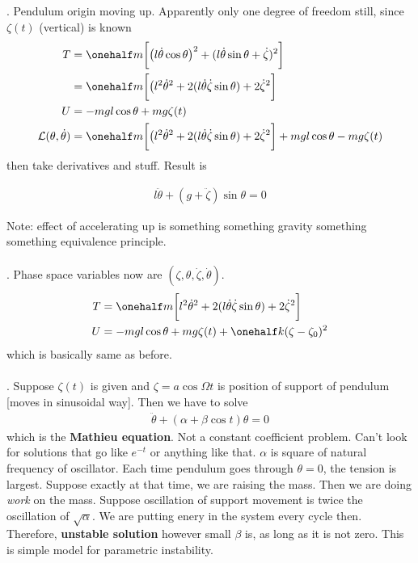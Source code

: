 \documentclass[10pt, twocolumn]{article}
\DeclareRobustCommand{\mybox}[2][gray!20]{%
	\begin{tcolorbox}[   %
		breakable,
		left=0pt,
		right=0pt,
		top=-13pt,
		bottom=0pt,
		colback=#1,
		colframe=#1,
		width=0.45\dimexpr\textwidth\relax,
		enlarge left by=0mm,
		boxsep=1pt,
		arc=0pt,outer arc=0pt,
		]
		#2
	\end{tcolorbox}
}
\newcommand\graybox[1]{ \mybox[gray!20]{\begin{align}#1\end{align}} }
\newcommand\p{\Needspace{10\baselineskip} \noindent}
\begin{document}
\p {}. Pendulum origin moving up. Apparently only one degree of freedom still, since $\zeta(t)$ (vertical) is known  
\begin{align}
	T &=	\onehalf m \bigg[ \big(l \dot{\theta}\cos\theta\big)^2 + (l\dot{\theta}\sin\theta + \dot{\zeta})^2 \bigg]  \\
	&= \onehalf m \bigg[ \big(l^2\dot{\theta}^2 + 2 (l\dot{\theta} \dot{\zeta}\sin\theta) +2\dot{\zeta}^2\bigg] \\
	U &= -mgl\cos\theta + mg\zeta(t) \\
	\mathcal{L}(\theta, \dot{\theta}) &= \onehalf m \bigg[ \big(l^2\dot{\theta}^2 + 2 (l\dot{\theta} \dot{\zeta}\sin\theta) +2\dot{\zeta}^2\bigg] +mgl\cos\theta - mg\zeta(t)  
\end{align} 
then take derivatives and stuff. Result is 
\graybox{l\ddot{\theta} + (g + \ddot{\zeta})\sin\theta = 0}
\p Note: effect of accelerating up is something something gravity something something equivalence principle. \\ \\

\p {}. Phase space variables now are $(\zeta, \theta, \dot{\zeta}, \dot{\theta})$. 
\begin{align}
	T &= \onehalf m \bigg[ l^2\dot{\theta}^2 + 2 (l\dot{\theta} \dot{\zeta}\sin\theta) +2\dot{\zeta}^2\bigg] \\
	U &= -mgl\cos\theta + mg\zeta(t) + \onehalf k (\zeta - \zeta_0)^2 
\end{align}
which is basically same as before.  \\ \\

\p \textbf{}. Suppose $\zeta(t)$ is given and $\zeta = a \cos\Omega t$ is position of support of pendulum [moves in sinusoidal way]. Then we have to solve
\begin{align}
\ddot{\theta} + (\alpha + \beta\cos t) \theta = 0
\end{align}
which is the \textbf{Mathieu equation}. Not a constant coefficient problem. Can't look for solutions that go like $e^{-t}$ or anything like that. $\alpha$ is square of natural frequency of oscillator. Each time pendulum goes through $\theta = 0$, the tension is largest. Suppose exactly at that time, we are raising the mass. Then we are doing \textit{work} on the mass. Suppose oscillation of support movement is twice the oscillation of $\sqrt{\alpha}$. We are putting enery in the system every cycle then. Therefore, \textbf{unstable solution} however small $\beta$ is, as long as it is not zero. This is simple model for parametric instability. 
\end{document}
